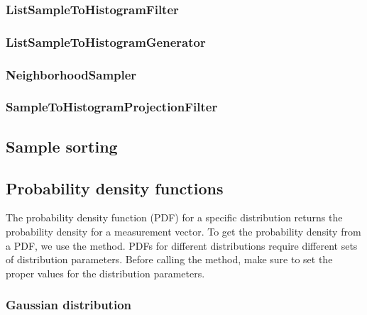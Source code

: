 \subsubsection{ListSampleToHistogramFilter}
\label{sec:ListSampleToHistogramFilter}



\subsubsection{ListSampleToHistogramGenerator}
\label{sec:ListSampleToHistogramGenerator}



\subsubsection{NeighborhoodSampler}
\label{sec:NeighborhoodSampler}



\subsubsection{SampleToHistogramProjectionFilter}
\label{sec:SampleToHistogramProjectionFilter}



\subsection{Sample sorting}
\label{sec:SampleSorting}



\subsection{Probability density functions}
\label{sec:ProbabilityDensityFunctions}

The probability density function (PDF) for a specific distribution returns the
probability density for a measurement vector. To get the probability
density from a PDF, we use the  method. PDFs for
different distributions require different sets of distribution
parameters. Before calling the  method, make sure to set
the proper values for the distribution parameters.

\subsubsection{Gaussian distribution}
\label{sec:GaussianDensityFunction}


